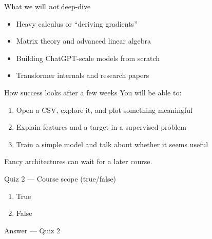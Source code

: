 \documentclass[aspectratio=169,11pt]{beamer}
\begin{document}
    \begin{frame}{What we will \emph{not} deep-dive}
        \begin{itemize}
            \item Heavy calculus or ``deriving gradients''
            \item Matrix theory and advanced linear algebra
            \item Building ChatGPT-scale models from scratch
            \item Transformer internals and research papers
        \end{itemize}
        \vspace{0.5em}
    \end{frame}

    \begin{frame}{How success looks after a few weeks}
        You will be able to:
        \begin{enumerate}
            \item Open a CSV, explore it, and plot something meaningful
            \item Explain features and a target in a supervised problem
            \item Train a simple model and talk about whether it seems useful
        \end{enumerate}
        \vspace{0.5em}
        Fancy architectures can wait for a later course.
    \end{frame}

    \begin{frame}{Quiz 2 --- Course scope (true/false)}
        \begin{enumerate}
            \item True
            \item False
        \end{enumerate}
        \quizpause
    \end{frame}

    \begin{frame}{Answer --- Quiz 2}
    \end{frame}
\end{document}
